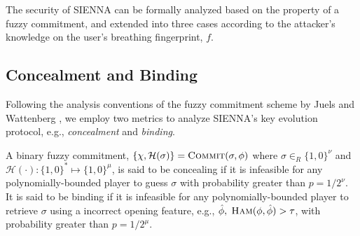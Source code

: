 
The security of SIENNA can be formally analyzed based on the property of a fuzzy commitment, and extended into three cases according to the attacker's knowledge on the user's breathing fingerprint, $f$.

\subsection{Concealment and Binding}
Following the analysis conventions of the fuzzy commitment scheme by Juels and Wattenberg \cite{JuelsFuzzyCommitmentScheme1999}, we employ two metrics to analyze SIENNA's key evolution protocol, e.g., \textit{concealment} and \textit{binding}. 

\begin{definition}
\label{def:concealment and binding}
A binary fuzzy commitment, $\{\chi, \mathcal{H}(\sigma)\} = \textsc{Commit}(\sigma, \phi)$ where $\sigma \in_{R} \{1,0\}^{\nu}$ and $\mathcal{H}(\cdot) : \{1,0\}^{*} \mapsto \{1,0\}^{\mu}$,%
is said to be concealing if it is infeasible for any polynomially-bounded player to guess $\sigma$ with probability greater than $p = 1/2^{\nu}$. It is said to be binding if it is infeasible for any polynomially-bounded player to retrieve $\sigma$ using a incorrect opening feature, e.g., $\hat{\phi},\; \textsc{Ham}(\phi, \hat{\phi}) > \tau$, with probability greater than $p = 1/2^{\mu}$. 
\end{definition}

